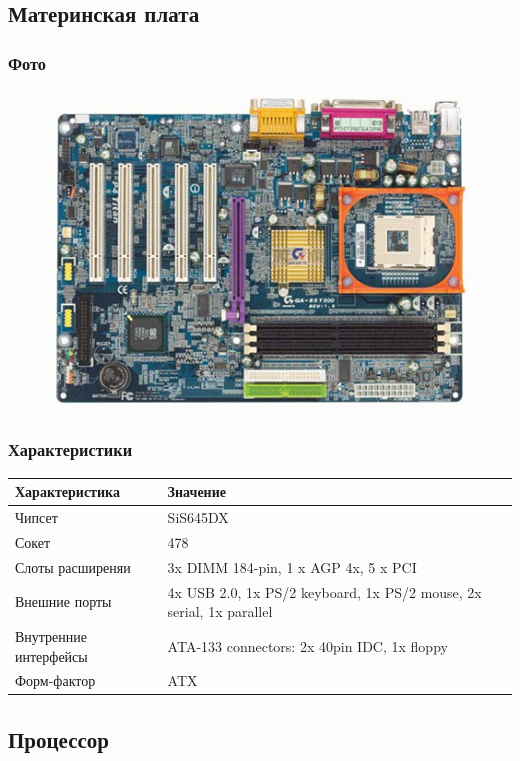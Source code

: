 \documentclass[a4paper]{article}
\begin{document}
\subsection{Материнская плата}
\subsubsection{Фото}
\begin{figure}[H]
\centering
\includegraphics[scale=0.5]{motherboard.jpg} 
\end{figure}
\subsubsection{Характеристики}
\begin{table}[H]
    \centering
    \begin{tabular}{|l|l|}
    \hline
    Характеристика & Значение \\
    \hline
    Чипсет & SiS645DX \\
    Сокет & 478 \\
    Слоты расширеняи & 3x DIMM 184-pin, 1 x AGP 4x, 5 x PCI \\
    Внешние порты & 4x USB 2.0, 1x PS/2 keyboard, 1x PS/2 mouse, 2x serial, 1x parallel \\
    Внутренние интерфейсы & ATA-133 connectors: 2x 40pin IDC, 1x floppy \\
    Форм-фактор & ATX \\
    \hline
\end{tabular}
\end{table}
    
\subsection{Процессор}
\end{document}
